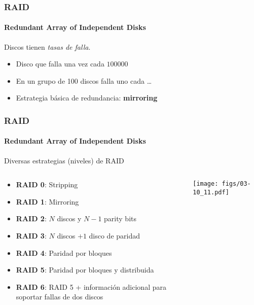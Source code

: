\documentclass[letter]{beamer}
\begin{document}
\begin{frame}
  \frametitle{RAID}
  \framesubtitle{Redundant Array of Independent Disks}
  
  Discos tienen {\em tasas de falla}.
  
  \begin{itemize}
    \item <2->Disco que falla una vez cada $100000$
    \item <3->En un grupo de 100 discos falla uno cada \ldots {}
  \end{itemize}
  
  \begin{itemize}
    \item <6->Estrategia básica de redundancia: {\bf mirroring}
  \end{itemize}
  
\end{frame}

\begin{frame}
  \frametitle{RAID}
  \framesubtitle{Redundant Array of Independent Disks}

  Diversas estrategias (niveles) de RAID
  \begin{columns}[c]
    \begin{column}[T]{7cm}
      \begin{itemize}
        \item {\bf RAID 0}: Stripping
        \item {\bf RAID 1}: Mirroring
        \item {\bf RAID 2}: $N$ discos y $N-1$ parity bits
        \item {\bf RAID 3}: $N$ discos $+ 1$ disco de paridad
        \item {\bf RAID 4}: Paridad por bloques
        \item {\bf RAID 5}: Paridad por bloques y distribuida
        \item {\bf RAID 6}: RAID 5 + información adicional para 
                            soportar fallas de dos discos
      \end{itemize}
    \end{column}
    \begin{column}[T]{3.5cm}
      \begin{center}
        \texttt{[image: figs/03-10\_11.pdf]}
      \end{center}
    \end{column}
  \end{columns}

\end{frame}
\end{document}
